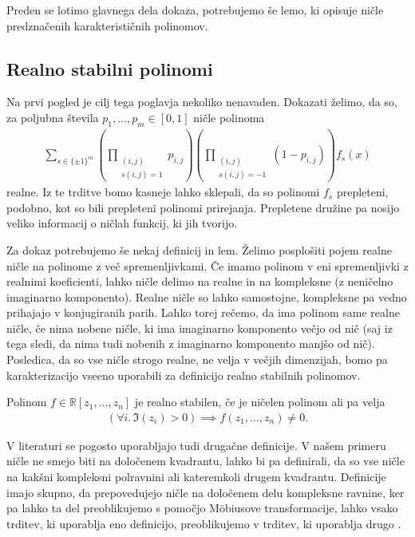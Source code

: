 Preden se lotimo glavnega dela dokaza, potrebujemo še lemo, ki opisuje ničle predznačenih karakterističnih polinomov.

\subsection{Realno stabilni polinomi}
Na prvi pogled je cilj tega poglavja nekoliko nenavaden. Dokazati želimo, da so, za poljubna števila \(p_1, \ldots, p_m \in [0,1]\) ničle polinoma
\begin{align*}
    \sum_{s\in \{\pm 1\}^m} \left(\prod_{\substack{(i,j) \\s(i,j)=1}} p_{i,j}\right) \left(\prod_{\substack{(i,j)\\s(i,j)=-1}} (1- p_{i,j})\right) f_s(x)
\end{align*}
realne. Iz te trditve bomo kasneje lahko sklepali, da so polinomi \(f_s\) prepleteni, podobno, kot so bili prepleteni polinomi prirejanja. Prepletene družine pa nosijo veliko informacij o ničlah funkcij, ki jih tvorijo.

Za dokaz potrebujemo še nekaj definicij in lem. Želimo posplošiti pojem realne ničle na polinome z več spremenljivkami. Če imamo polinom v eni spremenljivki z realnimi koeficienti, lahko ničle delimo na realne in na kompleksne (z neničelno imaginarno komponento). Realne ničle so lahko samostojne, kompleksne pa vedno prihajajo v konjugiranih parih. Lahko torej rečemo, da ima polinom same realne ničle, če nima nobene ničle, ki ima imaginarno komponento večjo od nič (saj iz tega sledi, da nima tudi nobenih z imaginarno komponento manjšo od nič). Posledica, da so vse ničle strogo realne, ne velja v večjih dimenzijah, bomo pa karakterizacijo vseeno uporabili za definicijo realno stabilnih polinomov.
\begin{definicija}
    Polinom \(f\in \mathbb R[z_1, \ldots, z_n]\) je realno stabilen, če je ničelen polinom ali pa velja
    \begin{align*}
        \left(\forall i.\, \Im(z_i) > 0\right) \implies f(z_1, \ldots, z_n) \neq 0.
    \end{align*}
\end{definicija}
V literaturi se pogosto uporabljajo tudi drugačne definicije. V našem primeru ničle ne smejo biti na določenem kvadrantu, lahko bi pa definirali, da so vse ničle na kakšni kompleksni polravnini ali kateremkoli drugem kvadrantu. Definicije imajo skupno, da prepovedujejo ničle na določenem delu kompleksne ravnine, ker pa lahko ta del preoblikujemo s pomočjo Möbiusove transformacije, lahko vsako trditev, ki uporablja eno definicijo, preoblikujemo v trditev, ki uporablja drugo \cite{mckenzie}.

